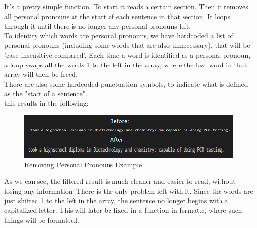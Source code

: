 It's a pretty simple function. To start it reads a certain section. Then it removes all personal pronouns at the start of each sentence in that section.
It loops through it until there is no longer any personal pronouns left.
\\
To identity which words are personal pronouns, we have hardcoded a list of personal pronouns\cite{english_personal_pronouns} (including some words that are also unnecessary), that will be 'case insensitive compared'.
Each time a word is identified as a personal pronoun, a loop swaps all the words 1 to the left in the array, where the last word in that array will then be freed.
\\
There are also some hardcoded punctuation symbols, to indicate what is defined as the "start of a sentence". 
\\
this results in the following:
\begin{figure}[H]
  \centering
  \includegraphics[scale = 0.6]{figures/personal_pronoun_ex.png}
  \caption{Removing Personal Pronouns Example}
\end{figure}

As we can see, the filtered result is much cleaner and easier to read, without losing any information.
There is the only problem left with it. Since the words are just shifted 1 to the left in the array, the sentence no longer begins
with a capitalized letter. This will later be fixed in a function in format.c, where such things will be formatted.

